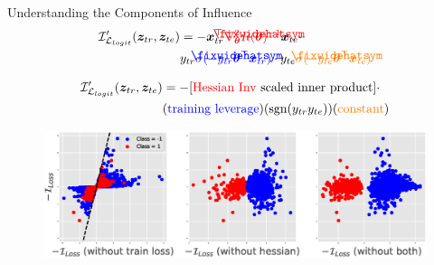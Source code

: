 \documentclass[blue]{beamer}
\newcommand\lowerwidehatsym{%
  \text{\smash{\raisebox{-1.3ex}{%
    $\fixwidehatsym$}}}}
\newcommand\fixwidehat[1]{%
  \mathchoice
    {\accentset{\displaystyle\lowerwidehatsym}{#1}}
    {\accentset{\textstyle\lowerwidehatsym}{#1}}
    {\accentset{\scriptstyle\lowerwidehatsym}{#1}}
    {\accentset{\scriptscriptstyle\lowerwidehatsym}{#1}}
}
\begin{document}
\begin{frame}{Understanding the Components of Influence}
\begin{align}\label{logit_I_loss2}
\vspace{-0.15in}
\mathcal{I}'_{\mathcal{L}_{logit}}(\bm{z}_{tr}, \bm{z}_{te}) &= -\bm{x}_{tr}^{\top}\textcolor{red}{\nabla_{\bm{\theta}}^2 R(\fixwidehat{\bm{\theta}})^{-1}} \bm{x}_{te}\cdot\\
&y_{tr}\textcolor{blue}{\sigma(-y_{tr}\fixwidehat{\bm{\theta}}^{\top}\bm{x}_{tr})}\cdot y_{te}\textcolor{orange}{\sigma(-y_{te}\fixwidehat{\bm{\theta}}^{\top}\bm{x}_{te})}\notag
\vspace{-0.15in}
\end{align}

\begin{align}\label{logit_I_loss2}
\vspace{-0.15in}
\mathcal{I}'_{\mathcal{L}_{logit}}(\bm{z}_{tr}, \bm{z}_{te}) &= -[\textcolor{red}{\text{Hessian Inv}} \text{ scaled inner product}]\cdot \\
&(\textcolor{blue}{\text{training leverage}})(\text{sgn}(y_{tr}y_{te}))(\textcolor{orange}{\text{constant}})\notag
\vspace{-0.15in}
\end{align}
   
   
\begin{figure}[ht]
\vskip 0.0in
\begin{center}
\centerline{\includegraphics[width=0.8\columnwidth]{fig-components}}
\vskip -0.1in
\label{logit_components}
\end{center}
\vskip -0.25in
\end{figure}
\end{frame}
\end{document}

